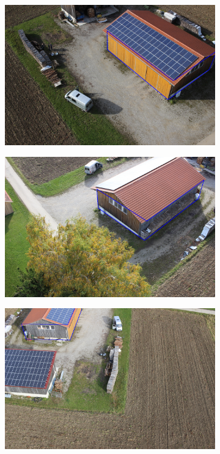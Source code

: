 \documentclass[remotesensing,article,accept,moreauthors,pdftex,10pt,a4paper]{mdpi}
\theoremstyle{mdpi}
\newcounter{ex}
\newcounter{re}
\begin{document}
\begin{figure}[H]
       \begin{subfigure}[tbp]{0.31\columnwidth}
           \centering
           \includegraphics[width=\textwidth]{optimize/IMG_0735_xyzh.png}
           \caption[]{}%
           {{\small }}
           \label{fig:5d}
       \end{subfigure}
       \begin{subfigure}[tbp]{0.31\columnwidth}  
           \centering 
           \includegraphics[width=\textwidth]{optimize/IMG_0765_xyzh.png}
           \caption[]{}%
           {{\small }}    
           \label{fig:5e}
       \end{subfigure}
       \begin{subfigure}[tbp]{0.31\columnwidth}  
           \centering 
           \includegraphics[width=\textwidth]{optimize/IMG_0951_xyzh.png}

\end{subfigure}
\end{figure}
\end{document}
